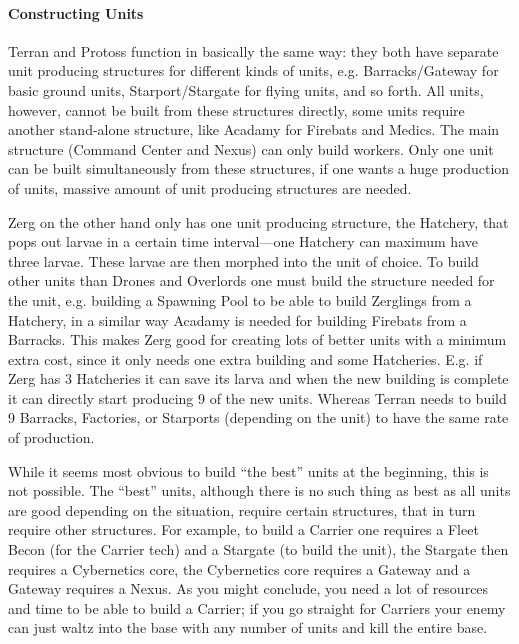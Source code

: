 \paragraph{Constructing Units}
Terran and Protoss function in basically the same way: they both have separate unit producing structures for different kinds of units, e.g. Barracks/Gateway for basic ground units, Starport/Stargate for flying units, and so forth. All units, however, cannot be built from these structures directly, some units require another stand-alone structure, like Acadamy for Firebats and Medics. The main structure (Command Center and Nexus) can only build workers. Only one unit can be built simultaneously from these structures, if one wants a huge production of units, massive amount of unit producing structures are needed.

Zerg on the other hand only has one unit producing structure, the Hatchery, that pops out larvae in a certain time interval—one Hatchery can maximum have three larvae. These larvae are then morphed into the unit of choice. To build other units than Drones and Overlords one must build the structure needed for the unit, e.g. building a Spawning Pool to be able to build Zerglings from a Hatchery, in a similar way Acadamy is needed for building Firebats from a Barracks. This makes Zerg good for creating lots of better units with a minimum extra cost, since it only needs one extra building and some Hatcheries. E.g. if Zerg has 3 Hatcheries it can save its larva and when the new building is complete it can directly start producing 9 of the new units. Whereas Terran needs to build 9 Barracks, Factories, or Starports (depending on the unit) to have the same rate of production.

While it seems most obvious to build “the best” units at the beginning, this is not possible. The “best” units, although there is no such thing as best as all units are good depending on the situation, require certain structures, that in turn require other structures. For example, to build a Carrier one requires a Fleet Becon (for the Carrier tech) and a Stargate (to build the unit), the Stargate then requires a Cybernetics core, the Cybernetics core requires a Gateway and a Gateway requires a Nexus. As you might conclude, you need a lot of resources and time to be able to build a Carrier; if you go straight for Carriers your enemy can just waltz into the base with any number of units and kill the entire base.


